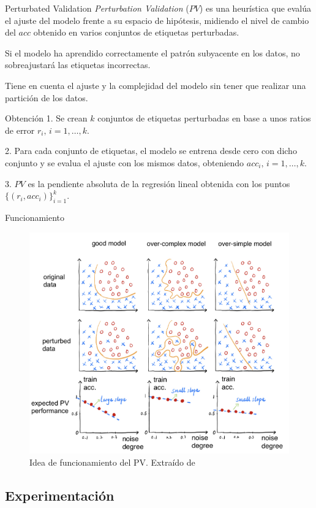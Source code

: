\documentclass[spanish]{beamer}
\begin{document}
\begin{frame}{Perturbated Validation}
  \emph{Perturbation Validation} ($PV$) es una heurística que evalúa el ajuste del modelo frente a su espacio de hipótesis, midiendo el nivel de cambio del $acc$ obtenido en varios conjuntos de etiquetas perturbadas.

  \pause

  Si el modelo ha aprendido correctamente el patrón subyacente en los datos, no sobreajustará las etiquetas incorrectas.

  \pause

  Tiene en cuenta el ajuste y la complejidad del modelo sin tener que realizar una partición de los datos.
\end{frame}


\begin{frame}{Obtención}
  1. Se crean $k$ conjuntos de etiquetas perturbadas en base a unos ratios de error $r_i, \, i = 1, \ldots, k$.
  \pause

  2. Para cada conjunto de etiquetas, el modelo se entrena desde cero con dicho conjunto y se evalua el ajuste con los mismos datos, obteniendo $acc_i, \, i = 1, \ldots, k$.
  \pause

  3. $PV$ es la pendiente absoluta de la regresión lineal obtenida con los puntos $\{(r_i, acc_i)\}_{i = 1}^k$.
\end{frame}

\begin{frame}{Funcionamiento}
  \begin{figure}
    \centering
    \includegraphics[width=.6\textwidth]{img/idea-pv}
    \caption{Idea de funcionamiento del PV. Extraído de \cite{pv}}
  \end{figure}
\end{frame}

\subsection{Experimentación}
\end{document}
